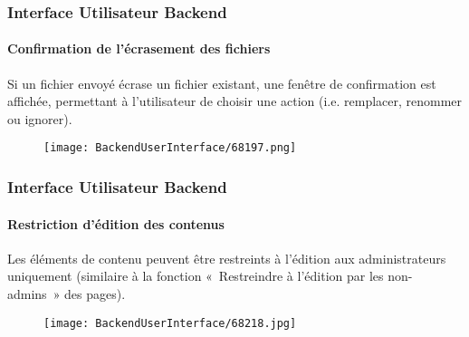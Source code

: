 \begin{frame}[fragile]
	\frametitle{Interface Utilisateur Backend}
	\framesubtitle{Confirmation de l'écrasement des fichiers}

	Si un fichier envoyé écrase un fichier existant, une fenêtre de confirmation est affichée,
	permettant à l'utilisateur de choisir une action (i.e. remplacer, renommer ou ignorer).

	\begin{figure}
		\texttt{[image: BackendUserInterface/68197.png]}
	\end{figure}

\end{frame}


\begin{frame}[fragile]
	\frametitle{Interface Utilisateur Backend}
	\framesubtitle{Restriction d'édition des contenus}

	Les éléments de contenu peuvent être restreints à l'édition aux administrateurs uniquement
	(similaire à la fonction «~Restreindre à l'édition par les non-admins~» des pages).

	\begin{figure}
		\texttt{[image: BackendUserInterface/68218.jpg]}
	\end{figure}

\end{frame}

